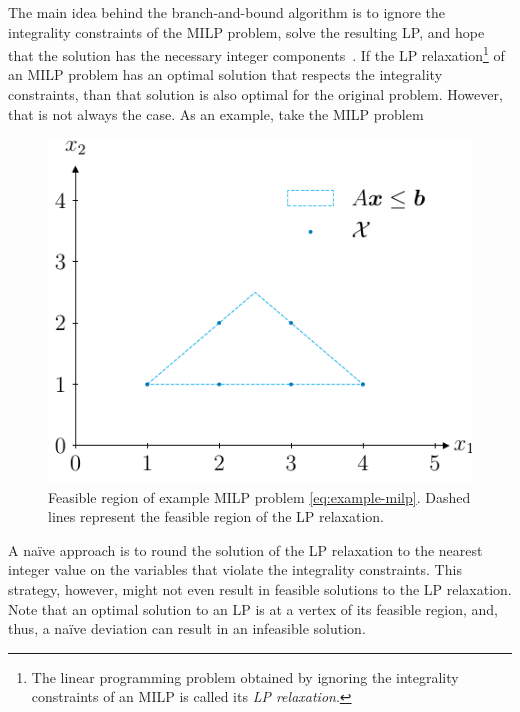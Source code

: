 The main idea behind the branch-and-bound algorithm is to ignore the integrality constraints of the MILP problem, solve the resulting LP, and hope that the solution has the necessary integer components~\cite{vanderbeiLinearProgrammingFoundations1998}.
If the LP relaxation\footnote{The linear programming problem obtained by ignoring the integrality constraints of an MILP is called its \emph{LP relaxation}.} of an MILP problem has an optimal solution that respects the integrality constraints, than that solution is also optimal for the original problem.
However, that is not always the case.
As an example, take the MILP problem

\begin{figure}[h]
    \centering
    \includegraphics{pictures/milp_example_feasible_region.pdf}
    \caption{Feasible region of example MILP problem \eqref{eq:example-milp}. Dashed lines represent the feasible region of the LP relaxation.}
    \label{fig:milp-example}
\end{figure}

A naïve approach is to round the solution of the LP relaxation to the nearest integer value on the variables that violate the integrality constraints.
This strategy, however, might not even result in feasible solutions to the LP relaxation.
Note that an optimal solution to an LP is at a vertex of its feasible region, and, thus, a naïve deviation can result in an infeasible solution.

